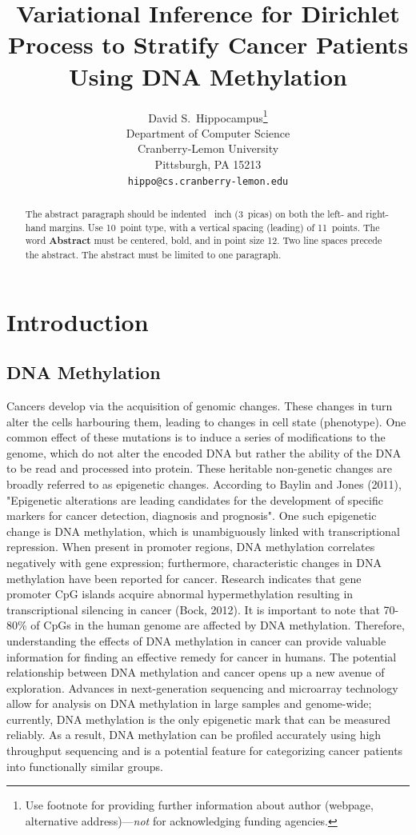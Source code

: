 \documentclass{article}
\title{Variational Inference for Dirichlet Process to Stratify Cancer
Patients Using DNA Methylation}
\author{%
  David S.~Hippocampus\thanks{Use footnote for providing further information
    about author (webpage, alternative address)---\emph{not} for acknowledging
    funding agencies.} \\
  Department of Computer Science\\
  Cranberry-Lemon University\\
  Pittsburgh, PA 15213 \\
  \texttt{hippo@cs.cranberry-lemon.edu} \\
}
\begin{document}
\maketitle

\begin{abstract}
  The abstract paragraph should be indented ~inch (3~picas) on
  both the left- and right-hand margins. Use 10~point type, with a vertical
  spacing (leading) of 11~points.  The word \textbf{Abstract} must be centered,
  bold, and in point size 12. Two line spaces precede the abstract. The abstract
  must be limited to one paragraph.
\end{abstract}

\section{Introduction}


\subsection{DNA Methylation}

Cancers develop via the acquisition of genomic changes. These changes in turn alter the cells harbouring them, leading to changes in cell state (phenotype). One common effect of these mutations is to induce a series of modifications to the genome, which do not alter the encoded DNA but rather the ability of the DNA to be read and processed into protein. These heritable non-genetic changes are broadly referred to as epigenetic changes. According to Baylin and Jones (2011), "Epigenetic alterations are leading candidates for the development of specific markers for cancer detection, diagnosis and prognosis". One such epigenetic change is DNA methylation, which is unambiguously linked with transcriptional repression. When present in promoter regions, DNA methylation correlates negatively with gene expression; furthermore, characteristic changes in DNA methylation have been reported for cancer. Research indicates that gene promoter CpG islands acquire abnormal hypermethylation resulting in transcriptional silencing in cancer (Bock, 2012). It is important to note that 70-80\% of CpGs in the human genome are affected by DNA methylation. Therefore, understanding the effects of DNA methylation in cancer can provide valuable information for finding an effective remedy for cancer in humans. The potential relationship between DNA methylation and cancer opens up a new avenue of exploration. Advances in next-generation sequencing and microarray technology allow for analysis on DNA methylation in large samples and genome-wide; currently, DNA methylation is the only epigenetic mark that can be measured reliably. As a result, DNA methylation can be profiled accurately using high throughput sequencing and is a potential feature for categorizing cancer patients into functionally similar groups. 
\end{document}
